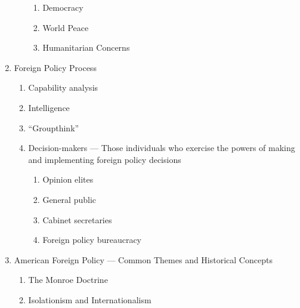 \documentclass[12pt]{article}
\begin{document}
\begin{enumerate}
\begin{enumerate}
\begin{enumerate}
              \item Democracy

              \item World Peace

              \item Humanitarian Concerns

            \end{enumerate}

        \end{enumerate}

      \item Foreign Policy Process

        \begin{enumerate}

          \item Capability analysis

          \item Intelligence

          \item “Groupthink”

          \item Decision-makers — Those individuals who exercise the powers of making and implementing foreign policy decisions

            \begin{enumerate}

              \item Opinion elites

              \item General public

              \item Cabinet secretaries

              \item Foreign policy bureaucracy

            \end{enumerate}

        \end{enumerate}

      \item American Foreign Policy — Common Themes and Historical Concepts

        \begin{enumerate}

          \item The Monroe Doctrine

          \item Isolationism and Internationalism


\end{enumerate}
\end{enumerate}
\end{document}
